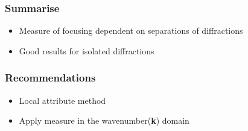 \begin{frame}

      {}
      {}
 

	
\end{frame}
\begin{frame}
 
      {}
      {}
 
\end{frame}
\begin{frame}
       {}
      {}
  

\end{frame}
\begin{frame}
  
      {}
      {}

\end{frame}

\begin{frame}
 
\end{frame}

\begin{frame} \frametitle{Summarise}

   \begin{itemize} 
    \item Measure of focusing dependent on separations of diffractions
    \item Good results for isolated diffractions 
     \end{itemize}
\end{frame}

\begin{frame} \frametitle{Recommendations}

   \begin{itemize} 
    \item Local attribute method
    \item Apply measure in the wavenumber(\textbf{k}) domain
     \end{itemize}
\end{frame}

